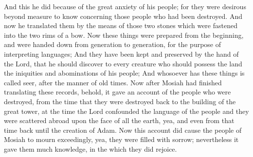 \bverse \iffalse And this he did because of the great anxiety of his people; for they were desirous beyond measure to know concerning those people who had been destroyed. \fi
And this he did because of the great anxiety of his people; for they were desirous beyond measure to know concerning those people who had been destroyed.
\bverse \iffalse And now he translated them by the means of those two stones which were fastened into the two rims of a bow. \fi
And now he translated them by the means of those two stones which were fastened into the two rims of a bow.
\bverse \iffalse Now these things were prepared from the beginning, and were handed down from generation to generation, for the purpose of interpreting languages; \fi
Now these things were prepared from the beginning, and were handed down from generation to generation, for the purpose of interpreting languages;
\bverse \iffalse And they have been kept and preserved by the hand of the Lord, that he should discover to every creature who should possess the land the iniquities and abominations of his people; \fi
And they have been kept and preserved by the hand of the Lord, that he should discover to every creature who should possess the land the iniquities and abominations of his people;
\bverse \iffalse And whosoever has these things is called seer, after the manner of old times. \fi
And whosoever has these things is called seer, after the manner of old times.
\bverse \iffalse Now after Mosiah had finished translating these records, behold, it gave an account of the people who were destroyed, from the time that they were destroyed back to the building of the great tower, at the time the Lord confounded the language of the people and they were scattered abroad upon the face of all the earth, yea, and even from that time back until the creation of Adam. \fi
Now after Mosiah had finished translating these records, behold, it gave an account of the people who were destroyed, from the time that they were destroyed back to the building of the great tower, at the time the Lord confounded the language of the people and they were scattered abroad upon the face of all the earth, yea, and even from that time back until the creation of Adam.
\bverse \iffalse Now this account did cause the people of Mosiah to mourn exceedingly, yea, they were filled with sorrow; nevertheless it gave them much knowledge, in the which they did rejoice. \fi
Now this account did cause the people of Mosiah to mourn exceedingly, yea, they were filled with sorrow; nevertheless it gave them much knowledge, in the which they did rejoice.
